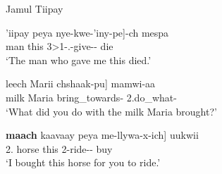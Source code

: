 \begin{exe}\ex\label{JamDep} {Jamul Tiipay} \citep[Yuman; California; ][207, 210, 259]{Miller:2001}\nopagebreak[4]
\begin{xlist}
\ex\gll  {\rm[}'iipay peya nye-kwe-'iny-pe{\rm]}-ch mespa\\
man this 3\textgreater 1-\sbj{}.\relativ{}-give-\dem{}-\nom{} die\\
`The man who gave me this died.'

\ex\gll  {\rm[}leech Marii chshaak-pu{\rm]} mamwi-aa\\
milk Maria bring\_towards-\dem{} 2.do\_what-\question{}\\
`What did you do with the milk Maria brought?'


\ex\gll  {\rm[}\textbf{maach} kaavaay peya me-llywa-x-ich{\rm]} uukwii\\
2\sg{}.\nom{} horse this 2-ride-\irr{}-\purp{} buy\\
`I bought this horse for you to ride.' %

\end{xlist}
\end{exe}


